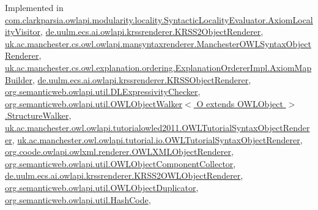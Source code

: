 Implemented in \hyperlink{classcom_1_1clarkparsia_1_1owlapi_1_1modularity_1_1locality_1_1_syntactic_locality_evaluator_1_1_axiom_locality_visitor_adaa369829f2ec3dca9049c87a37dcad6}{com.\-clarkparsia.\-owlapi.\-modularity.\-locality.\-Syntactic\-Locality\-Evaluator.\-Axiom\-Locality\-Visitor}, \hyperlink{classde_1_1uulm_1_1ecs_1_1ai_1_1owlapi_1_1krssrenderer_1_1_k_r_s_s2_object_renderer_a3282043d659f55096db488baf8d4c1f6}{de.\-uulm.\-ecs.\-ai.\-owlapi.\-krssrenderer.\-K\-R\-S\-S2\-Object\-Renderer}, \hyperlink{classuk_1_1ac_1_1manchester_1_1cs_1_1owl_1_1owlapi_1_1mansyntaxrenderer_1_1_manchester_o_w_l_syntax_object_renderer_a962cbbd6e02c754d490a578b918a368c}{uk.\-ac.\-manchester.\-cs.\-owl.\-owlapi.\-mansyntaxrenderer.\-Manchester\-O\-W\-L\-Syntax\-Object\-Renderer}, \hyperlink{classuk_1_1ac_1_1manchester_1_1cs_1_1owl_1_1explanation_1_1ordering_1_1_explanation_orderer_impl_1_1_axiom_map_builder_a435e704e0992f0bd96bd44645f37da28}{uk.\-ac.\-manchester.\-cs.\-owl.\-explanation.\-ordering.\-Explanation\-Orderer\-Impl.\-Axiom\-Map\-Builder}, \hyperlink{classde_1_1uulm_1_1ecs_1_1ai_1_1owlapi_1_1krssrenderer_1_1_k_r_s_s_object_renderer_a891f58e7b18faca0d6c19cb85e4fba01}{de.\-uulm.\-ecs.\-ai.\-owlapi.\-krssrenderer.\-K\-R\-S\-S\-Object\-Renderer}, \hyperlink{classorg_1_1semanticweb_1_1owlapi_1_1util_1_1_d_l_expressivity_checker_a500a0670621274522f6ac7b904ecba3e}{org.\-semanticweb.\-owlapi.\-util.\-D\-L\-Expressivity\-Checker}, \hyperlink{classorg_1_1semanticweb_1_1owlapi_1_1util_1_1_o_w_l_object_walker_3_01_o_01extends_01_o_w_l_object_01_4_1_1_structure_walker_a8ace00a9bc7628e42df9ea020c916845}{org.\-semanticweb.\-owlapi.\-util.\-O\-W\-L\-Object\-Walker$<$ O extends O\-W\-L\-Object $>$.\-Structure\-Walker}, \hyperlink{classuk_1_1ac_1_1manchester_1_1owl_1_1owlapi_1_1tutorialowled2011_1_1_o_w_l_tutorial_syntax_object_renderer_aeea58a1751a43db96551a0175ad9c0e8}{uk.\-ac.\-manchester.\-owl.\-owlapi.\-tutorialowled2011.\-O\-W\-L\-Tutorial\-Syntax\-Object\-Renderer}, \hyperlink{classuk_1_1ac_1_1manchester_1_1owl_1_1owlapi_1_1tutorial_1_1io_1_1_o_w_l_tutorial_syntax_object_renderer_adfe5c1f8646592dfdbc21be824c32863}{uk.\-ac.\-manchester.\-owl.\-owlapi.\-tutorial.\-io.\-O\-W\-L\-Tutorial\-Syntax\-Object\-Renderer}, \hyperlink{classorg_1_1coode_1_1owlapi_1_1owlxml_1_1renderer_1_1_o_w_l_x_m_l_object_renderer_a468cf46d6efef08a52c1692b1b8fd55e}{org.\-coode.\-owlapi.\-owlxml.\-renderer.\-O\-W\-L\-X\-M\-L\-Object\-Renderer}, \hyperlink{classorg_1_1semanticweb_1_1owlapi_1_1util_1_1_o_w_l_object_component_collector_aa667334572bbf49e652af69237f13600}{org.\-semanticweb.\-owlapi.\-util.\-O\-W\-L\-Object\-Component\-Collector}, \hyperlink{classde_1_1uulm_1_1ecs_1_1ai_1_1owlapi_1_1krssrenderer_1_1_k_r_s_s2_o_w_l_object_renderer_a60d9030aa33a80afa4cea1dcb4d72127}{de.\-uulm.\-ecs.\-ai.\-owlapi.\-krssrenderer.\-K\-R\-S\-S2\-O\-W\-L\-Object\-Renderer}, \hyperlink{classorg_1_1semanticweb_1_1owlapi_1_1util_1_1_o_w_l_object_duplicator_a272177db3211ff1ad57f71744f0f1c9f}{org.\-semanticweb.\-owlapi.\-util.\-O\-W\-L\-Object\-Duplicator}, \hyperlink{classorg_1_1semanticweb_1_1owlapi_1_1util_1_1_hash_code_acfe02f0392a4bf5eb6a291f387ea1092}{org.\-semanticweb.\-owlapi.\-util.\-Hash\-Code}, 
